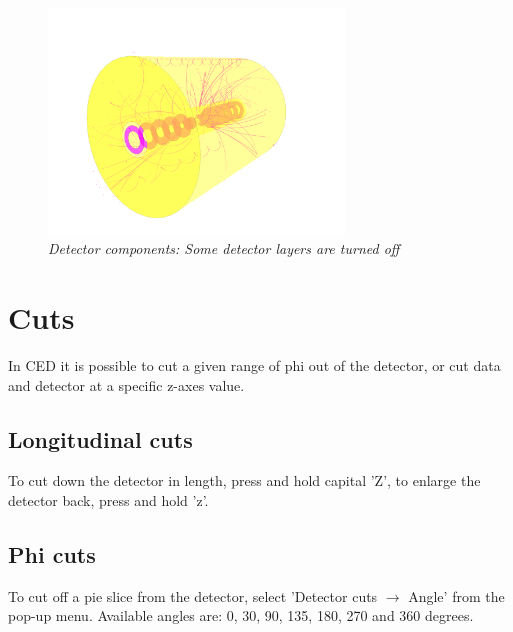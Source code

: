 \documentclass[a4paper,10pt]{article}
\begin{document}
\begin{figure}[h]
\centerline{\includegraphics[height=6cm]{detector_layer.png}}
\caption{\label{detectorlayer} \textsl{Detector components: Some detector layers are turned off}}
\end{figure}

\section{Cuts}
In CED it is possible to cut a given range of phi out of the detector, or cut data and detector at a specific z-axes value.

\subsection{Longitudinal cuts}
To cut down the detector in length, press and hold capital 'Z', to enlarge the detector back, press and hold 'z'.

\subsection{Phi cuts}
To cut off a pie slice from the detector, select 'Detector cuts $\rightarrow$ Angle' from the pop-up menu. Available angles are: 0, 30, 90, 135, 180, 270 and 360 degrees. 
\end{document}
